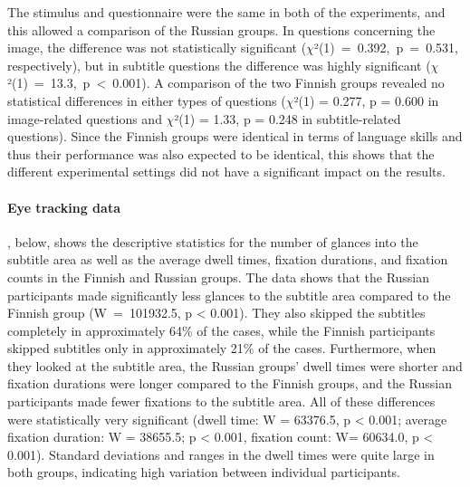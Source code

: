 \documentclass[output=paper]{langsci/langscibook}
\begin{document}
The stimulus and questionnaire were the same in both of the experiments, and this allowed a comparison of the Russian groups. In questions concerning the image, the difference was not statistically significant ($\chi $²(1)~=~0.392,~p~=~0.531, respectively), but in subtitle questions the difference was highly significant ($\chi $²(1)~=~13.3,~p~{\textless}~0.001). A comparison of the two Finnish groups revealed no statistical differences in either types of questions ($\chi $²(1) = 0.277, p = 0.600 in image-related questions and $\chi $²(1) = 1.33, p = 0.248 in subtitle-related questions). Since the Finnish groups were identical in terms of language skills and thus their performance was also expected to be identical, this shows that the different experimental settings did not have a significant impact on the results.

\paragraph{Eye tracking data}

, below, shows the descriptive statistics for the number of glances into the subtitle area as well as the average dwell times, fixation durations, and fixation counts in the Finnish and Russian groups. The data shows that the Russian participants made significantly less glances to the subtitle area compared to the Finnish group (W~=~101932.5, p {\textless} 0.001). They also skipped the subtitles completely in approximately 64\% of the cases, while the Finnish participants skipped subtitles only in approximately 21\% of the cases. Furthermore, when they looked at the subtitle area, the Russian groups’ dwell times were shorter and fixation durations were longer compared to the Finnish groups, and the Russian participants made fewer fixations to the subtitle area. All of these differences were statistically very significant (dwell time: W = 63376.5, p {\textless} 0.001; average fixation duration: W = 38655.5; p {\textless} 0.001, fixation count: W= 60634.0, p {\textless} 0.001). Standard deviations and ranges in the dwell times were quite large in both groups, indicating high variation between individual participants.
\end{document}
